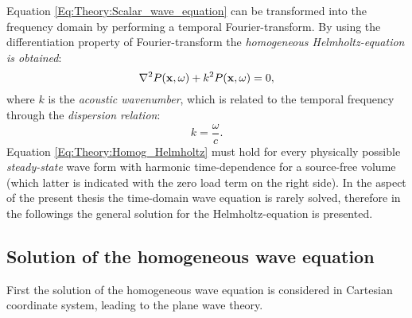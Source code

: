 \vspace{3mm}
%
Equation \eqref{Eq:Theory:Scalar_wave_equation} can be transformed into the frequency domain by performing a temporal Fourier-transform. By using the differentiation property of Fourier-transform the \emph{homogeneous Helmholtz-equation is obtained}:
\begin{equation}
\nabla^2 P(\mathbf{x},\omega) + k^2 P(\mathbf{x},\omega) = 0,
\label{Eq:Theory:Homog_Helmholtz}
\end{equation}
where $k$ is the \emph{acoustic wavenumber}, which is related to the temporal frequency through the \emph{dispersion relation}:
\begin{equation}
k = \frac{\omega}{c}.
\end{equation}
%
Equation \eqref{Eq:Theory:Homog_Helmholtz} must hold for every physically possible \emph{steady-state} wave form with harmonic time-dependence for a source-free volume (which latter is indicated with the zero load term on the right side). In the aspect of the present thesis the time-domain wave equation is rarely solved, therefore in the followings the general solution for the Helmholtz-equation is presented.

\subsection{Solution of the homogeneous wave equation}

First the solution of the homogeneous wave equation is considered in Cartesian coordinate system, leading to the plane wave theory.

